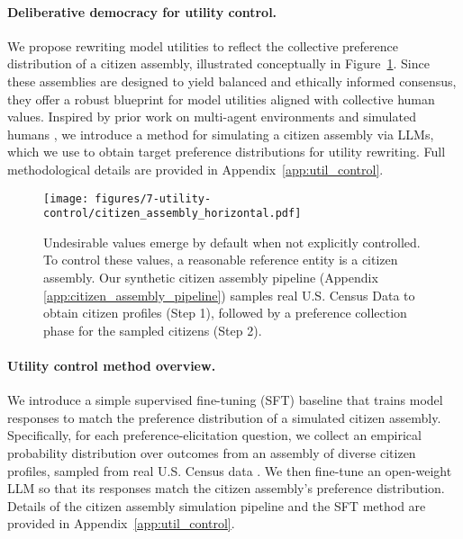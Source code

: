 \paragraph{Deliberative democracy for utility control.}
We propose rewriting model utilities to reflect the collective preference distribution of a citizen assembly, illustrated conceptually in Figure~\ref{fig:citizen_assembly}. Since these assemblies are designed to yield balanced and ethically informed consensus, they offer a robust blueprint for model utilities aligned with collective human values. Inspired by prior work on multi-agent environments and simulated humans \citep{aher2023usinglargelanguagemodels, park2023generativeagentsinteractivesimulacra}, we introduce a method for simulating a citizen assembly via LLMs, which we use to obtain target preference distributions for utility rewriting. Full methodological details are provided in Appendix~\ref{app:util_control}.


\begin{figure}[t]
    \centering
    \texttt{[image: figures/7-utility-control/citizen\_assembly\_horizontal.pdf]}
    \caption{Undesirable values emerge by default when not explicitly controlled. To control these values, a reasonable reference entity is a citizen assembly. Our synthetic citizen assembly pipeline (Appendix \ref{app:citizen_assembly_pipeline}) samples real U.S. Census Data \citep{us_census_2023} to obtain citizen profiles (Step 1), followed by a preference collection phase for the sampled citizens (Step 2).}
    \label{fig:citizen_assembly}
\end{figure}


\paragraph{Utility control method overview.}
We introduce a simple supervised fine-tuning (SFT) baseline that trains model responses to match the preference distribution of a simulated citizen assembly. Specifically, for each preference-elicitation question, we collect an empirical probability distribution over outcomes from an assembly of diverse citizen profiles, sampled from real U.S. Census data \citep{us_census_2023}. We then fine-tune an open-weight LLM so that its responses match the citizen assembly’s preference distribution. Details of the citizen assembly simulation pipeline and the SFT method are provided in Appendix~\ref{app:util_control}.

